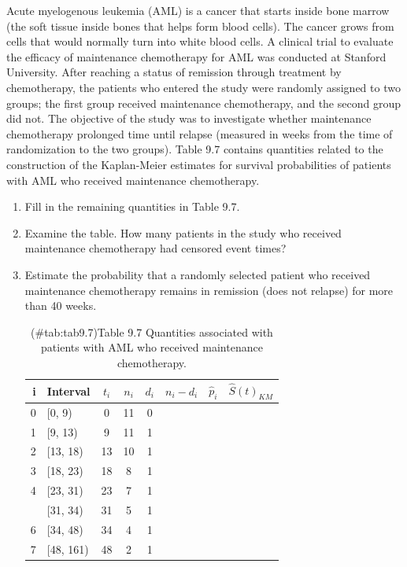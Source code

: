 \documentclass[
]{report}
\begin{document}
\begin{list}{E.}{ \setlength{\itemsep}{1.2em}}
  \item Acute myelogenous leukemia (AML) is a cancer that starts inside bone marrow (the soft tissue inside bones that helps form blood cells). The cancer grows from cells that would normally turn into white blood cells. A clinical trial to evaluate the efficacy of maintenance chemotherapy for AML was conducted at Stanford University. After reaching a status of remission through treatment by chemotherapy, the patients who entered the study were randomly assigned to two groups; the first group received maintenance chemotherapy, and the second group did not. The objective of the study was to investigate whether maintenance chemotherapy prolonged time until relapse (measured in weeks from the time of randomization to the two groups). Table 9.7 contains quantities related to the construction of the Kaplan-Meier estimates for survival probabilities of patients with AML who received maintenance chemotherapy.
  \begin{enumerate}
    \item Fill in the remaining quantities in Table 9.7.
    \item Examine the table. How many patients in the study who received maintenance chemotherapy had censored event times?
    \item Estimate the probability that a randomly selected patient who received maintenance chemotherapy remains in remission (does not relapse) for more than 40 weeks.
\begin{table}[!h]
\centering
\caption{(\#tab:tab9.7)Table 9.7 Quantities associated with patients with AML who received maintenance chemotherapy.}
\centering
\begin{tabular}[t]{rlcccccc}
\toprule
i & Interval & $t_i$ & $n_i$ & $d_i$ & $n_i - d_i$ & $\hat{p}_i$ & $\hat{S}(t)_{KM}$\\
\midrule
0 & {}[0, 9) & 0 & 11 & 0 &  &  & \\
1 & {}[9, 13) & 9 & 11 & 1 &  &  & \\
2 & {}[13, 18) & 13 & 10 & 1 &  &  & \\
3 & {}[18, 23) & 18 & 8 & 1 &  &  & \\
4 & {}[23, 31) & 23 & 7 & 1 &  &  & \\
\addlinespace
5 & {}[31, 34) & 31 & 5 & 1 &  &  & \\
6 & {}[34, 48) & 34 & 4 & 1 &  &  & \\
7 & {}[48, 161) & 48 & 2 & 1 &  &  & \\
\bottomrule
\end{tabular}

\end{table}
\end{enumerate}
\end{list}
\end{document}
